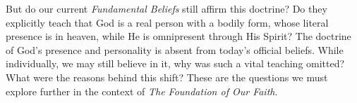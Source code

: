 But do our current \textit{Fundamental Beliefs} still affirm this doctrine? Do they explicitly teach that God is a real person with a bodily form, whose literal presence is in heaven, while He is omnipresent through His Spirit? The doctrine of God’s presence and personality is absent from today’s official beliefs. While individually, we may still believe in it, why was such a vital teaching omitted? What were the reasons behind this shift? These are the questions we must explore further in the context of \textit{The Foundation of Our Faith}.

